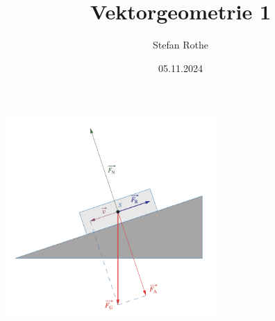 \documentclass[parskip=half]{scrartcl}
\title{Vektorgeometrie 1}
\author{Stefan Rothe}
\date{05.11.2024}
\begin{document}
  \maketitle
  \thispagestyle{firstpage}
  \begin{center}
    \includegraphics[width=0.6\textwidth]{title.png}
  \end{center}
  \tableofcontents
  \newpage
  
  
  
  
  
\end{document}
